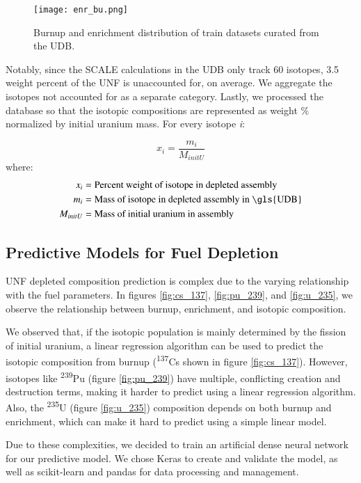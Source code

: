 \begin{figure}
    \centering
    \texttt{[image: enr\_bu.png]}
    \caption{Burnup and enrichment distribution of train
             datasets curated from the \gls{UDB}.}
    \label{fig:enr_bu}
\end{figure}


Notably, since the SCALE calculations in the \gls{UDB} only track 60 isotopes,
3.5 weight percent of the \gls{UNF} is unaccounted for, on average. We
aggregate the isotopes not accounted for as a separate category. Lastly,
we processed the database so that the isotopic compositions are 
represented as weight \% normalized by initial uranium mass.
For every isotope \textit{i}:

\begin{equation}
x_i = \frac{m_i}{M_{initU}}
\end{equation}
where:
\begin{align}
x_i &= \text{Percent weight of isotope in depleted assembly}\\
m_i &= \text{Mass of isotope in depleted assembly in \gls{UDB}}\\
M_{initU} &= \text{Mass of initial uranium in assembly}
\end{align}


\subsection{Predictive Models for Fuel Depletion}

\gls{UNF} depleted composition prediction is complex
due to the varying relationship with the fuel parameters.
In figures \ref{fig:cs_137}, \ref{fig:pu_239}, and \ref{fig:u_235},
we observe the relationship between
burnup, enrichment, and isotopic composition.

We observed that, if the isotopic population is mainly determined by
the fission of initial uranium, a linear regression algorithm
can be used to predict the isotopic composition from burnup
(\textsuperscript{137}Cs shown in figure \ref{fig:cs_137}).
However, isotopes like \textsuperscript{239}Pu (figure \ref{fig:pu_239}) have multiple, conflicting creation
and destruction terms, making it harder to predict using a
linear regression algorithm. Also, the \textsuperscript{235}U (figure \ref{fig:u_235})
composition
depends on both burnup and enrichment, which can make it
hard to predict using a simple linear model.

Due to these complexities, we decided to train an artificial
dense neural network for our predictive model. We chose
Keras \cite{collet_keras_2015} to create and validate the model,
as well as scikit-learn \cite{pedregosa_scikit-learn_2011}
and pandas \cite{mckinney-proc-scipy-2010} for data processing and management.

